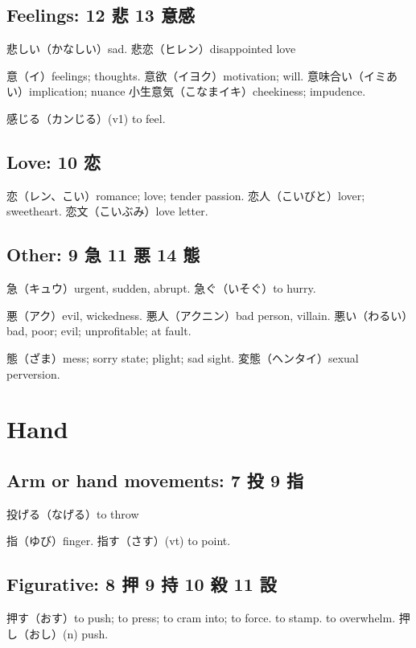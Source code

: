 \subsection{Feelings: 12 悲 13 意感}

悲しい（かなしい）sad.
悲恋（ヒレン）disappointed love

意（イ）feelings; thoughts.
意欲（イヨク）motivation; will.
意味合い（イミあい）implication; nuance
小生意気（こなまイキ）cheekiness; impudence.

感じる（カンじる）(v1) to feel.

\subsection{Love: 10 恋}

恋（レン、こい）romance; love; tender passion.
恋人（こいびと）lover; sweetheart.
恋文（こいぶみ）love letter.

\subsection{Other: 9 急 11 悪 14 態}

急（キュウ）urgent, sudden, abrupt.
急ぐ（いそぐ）to hurry.

悪（アク）evil, wickedness.
悪人（アクニン）bad person, villain.
悪い（わるい）bad, poor; evil; unprofitable; at fault.

態（ざま）mess; sorry state; plight; sad sight.
変態（ヘンタイ）sexual perversion.

\section{Hand}

\subsection{Arm or hand movements: 7 投 9 指}

投げる（なげる）to throw

指（ゆび）finger.
指す（さす）(vt) to point.

\subsection{Figurative: 8 押 9 持 10 殺 11 設}

押す（おす）to push; to press; to cram into; to force.
to stamp.
to overwhelm.
押し（おし）(n) push.

